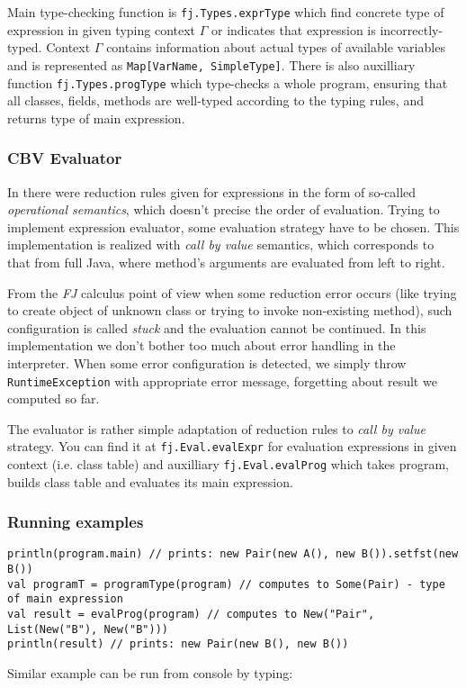 \documentclass{article}[12pt]
\begin{document}
Main type-checking function is \texttt{fj.Types.exprType} which find concrete type of expression in given typing context $\Gamma$ or indicates that expression is incorrectly-typed. Context $\Gamma$ contains information about actual types of available variables and is represented as \texttt{Map[VarName, SimpleType]}. There is also auxilliary function \texttt{fj.Types.progType} which type-checks a whole program, ensuring that all classes, fields, methods are well-typed according to the typing rules, and returns type of main expression.

\subsubsection{CBV Evaluator}

In \cite{fj} there were reduction rules given for expressions in the form of so-called \emph{operational semantics}, which doesn't precise the order of evaluation. Trying to implement expression evaluator, some evaluation strategy have to be chosen. This implementation is realized with \emph{call by value} semantics, which corresponds to that from full Java, where method's arguments are evaluated from left to right.

From the \emph{FJ} calculus point of view when some reduction error occurs (like trying to create object of unknown class or trying to invoke non-existing method), such configuration is called \emph{stuck} and the evaluation cannot be continued. In this implementation we don't bother too much about error handling in the interpreter. When some error configuration is detected, we simply throw \texttt{RuntimeException} with appropriate error message, forgetting about result we computed so far.

The evaluator is rather simple adaptation of reduction rules to \emph{call by value} strategy. You can find it at \texttt{fj.Eval.evalExpr} for evaluation expressions in given context (i.e. class table) and auxilliary \texttt{fj.Eval.evalProg} which takes program, builds class table and evaluates its main expression.

\subsubsection{Running examples}

\begin{verbatim}
println(program.main) // prints: new Pair(new A(), new B()).setfst(new B())
val programT = programType(program) // computes to Some(Pair) - type of main expression
val result = evalProg(program) // computes to New("Pair", List(New("B"), New("B")))
println(result) // prints: new Pair(new B(), new B())
\end{verbatim}
Similar example can be run from console by typing:
\end{document}
